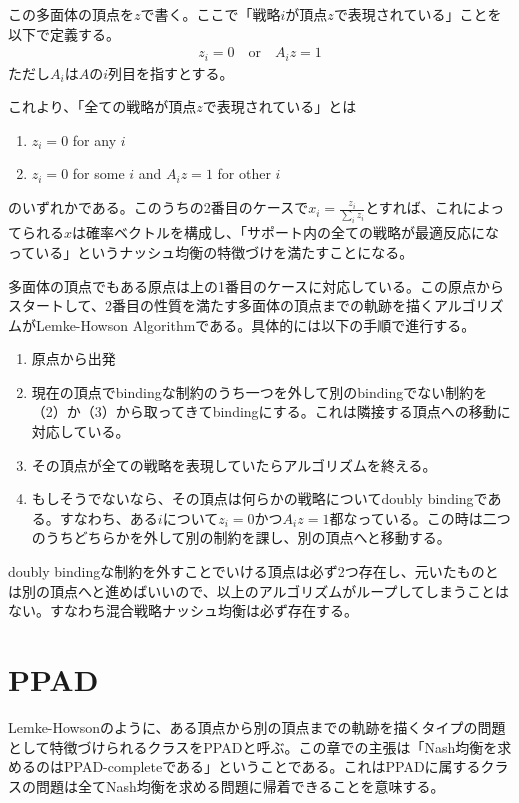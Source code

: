 \documentclass{jsarticle}
\begin{document}
この多面体の頂点を$z$で書く。ここで「戦略$i$が頂点$z$で表現されている」ことを以下で定義する。
\begin{align}
	z_i = 0\quad \text{or}\quad A_i z = 1
\end{align}
ただし$A_i$は$A$の$i$列目を指すとする。

これより、「全ての戦略が頂点$z$で表現されている」とは
\begin{enumerate}
	\item $z_i = 0$ for any $i$
	\item $z_i = 0$ for some $i$ and $A_i z = 1$ for other $i$
\end{enumerate}
のいずれかである。このうちの2番目のケースで$x_i = \frac{z_i}{\sum_i z_i}$とすれば、これによってられる$x$は確率ベクトルを構成し、「サポート内の全ての戦略が最適反応になっている」というナッシュ均衡の特徴づけを満たすことになる。

多面体の頂点でもある原点は上の1番目のケースに対応している。この原点からスタートして、2番目の性質を満たす多面体の頂点までの軌跡を描くアルゴリズムがLemke-Howson Algorithmである。具体的には以下の手順で進行する。

\begin{enumerate}
	\item 原点から出発
	\item 現在の頂点でbindingな制約のうち一つを外して別のbindingでない制約を（2）か（3）から取ってきてbindingにする。これは隣接する頂点への移動に対応している。
	\item その頂点が全ての戦略を表現していたらアルゴリズムを終える。
	\item もしそうでないなら、その頂点は何らかの戦略についてdoubly bindingである。すなわち、ある$i$について$z_i = 0$かつ$A_i z = 1$都なっている。この時は二つのうちどちらかを外して別の制約を課し、別の頂点へと移動する。
\end{enumerate}

doubly bindingな制約を外すことでいける頂点は必ず2つ存在し、元いたものとは別の頂点へと進めばいいので、以上のアルゴリズムがループしてしまうことはない。すなわち混合戦略ナッシュ均衡は必ず存在する。


\section{PPAD}
Lemke-Howsonのように、ある頂点から別の頂点までの軌跡を描くタイプの問題として特徴づけられるクラスをPPADと呼ぶ。この章での主張は「Nash均衡を求めるのはPPAD-completeである」ということである。これはPPADに属するクラスの問題は全てNash均衡を求める問題に帰着できることを意味する。
\end{document}
